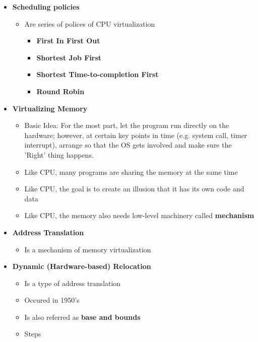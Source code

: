 \documentclass[12pt]{article}
\begin{document}
\begin{enumerate}[1.]
\begin{enumerate}[a)]
\begin{itemize}
            \item \textbf{Scheduling policies}

            \begin{itemize}
                \item Are series of polices of CPU virtualization

                \begin{itemize}
                    \item \textbf{First In First Out}
                    \item \textbf{Shortest Job First}
                    \item \textbf{Shortest Time-to-completion First}
                    \item \textbf{Round Robin}
                \end{itemize}
            \end{itemize}

            \item \textbf{Virtualizing Memory}
            \begin{itemize}
                \item Basic Idea: For the most part, let the program run directly on the hardware;
                however, at certain key points in time (e.g. system call, timer interrupt), arrange
                so that the OS gets involved and make sure the 'Right' thing happens.
                \item Like CPU, many programs are sharing the memory at the same time
                \item Like CPU, the goal is to create an illusion that it has its own code and data
                \item Like CPU, the memory also needs low-level machinery called \textbf{mechanism}
            \end{itemize}

            \item \textbf{Address Translation}

            \begin{itemize}
                \item Is a mechanism of memory virtualization
            \end{itemize}

            \item \textbf{Dynamic (Hardware-based) Relocation}

            \begin{itemize}
                \item Is a type of address translation
                \item Occured in 1950's
                \item Is also referred as \textbf{base and bounds}
                \item Steps


\end{itemize}
\end{itemize}
\end{enumerate}
\end{enumerate}
\end{document}

